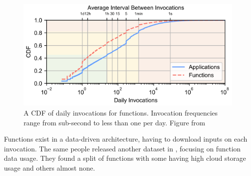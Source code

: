\begin{figure}
  \begin{center}
    \includegraphics[width=.6\columnwidth]{./figures/wild-invocations.png}
    \caption{A CDF of daily invocations for functions. 
              Invocation frequencies range from sub-second to less than one per day. 
              Figure from \cite{shahrad_serverless_2020}}
  \label{fig:wild-invokes}
\end{center}
\end{figure}

Functions exist in a data-driven architecture, having to download inputs on each invocation.
The same people released another dataset in \cite{romero2021faa}, focusing on function data usage.
They found a split of functions with some having high cloud storage usage and others almost none.

